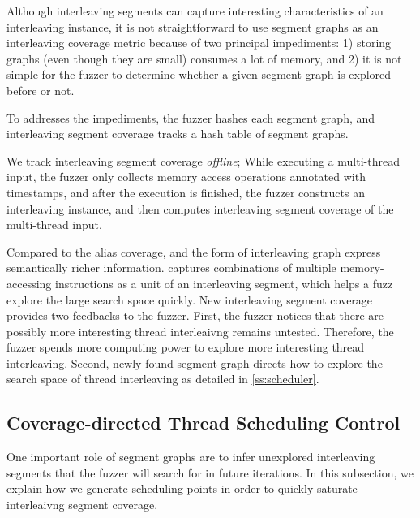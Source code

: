 %
Although interleaving segments can capture interesting characteristics
of an interleaving instance, it is not straightforward to use segment
graphs as an interleaving coverage metric because of two principal
impediments: 1) storing graphs (even though they are small) consumes a
lot of memory, and 2) it is not simple for the fuzzer to determine
whether a given segment graph is explored before or not.



To addresses the impediments, the fuzzer hashes each segment graph,
and interleaving segment coverage tracks a hash table of segment
graphs.
%





We track interleaving segment coverage \textit{offline}; While
executing a multi-thread input, the fuzzer only collects memory access
operations annotated with timestamps, and after the execution is
finished, the fuzzer constructs an interleaving instance, and then
computes interleaving segment coverage of the multi-thread input.


Compared to the alias coverage, \intcov and the form of interleaving graph
express semantically richer information. \intcov captures combinations 
of multiple memory-accessing instructions as a unit of an interleaving segment, which helps a fuzz explore the large search space quickly. 
%
New interleaving segment coverage provides two feedbacks to the
fuzzer.
%
First, the fuzzer notices that there are possibly more interesting
thread interleaivng remains untested. Therefore, the fuzzer spends
more computing power to explore more interesting thread interleaving.
%
Second, newly found segment graph directs how to explore the search
space of thread interleaving as detailed in \autoref{ss:scheduler}.





\subsection{Coverage-directed Thread Scheduling Control}
\label{ss:scheduler}
%
One important role of segment graphs are to infer unexplored
interleaving segments that the fuzzer will search for in future
iterations.
%
In this subsection, we explain how we generate scheduling points in
order to quickly saturate interleaivng segment coverage.

